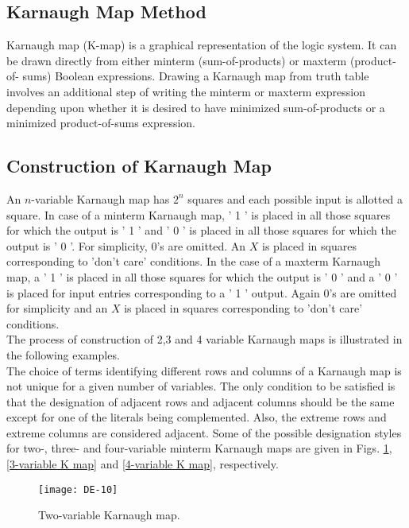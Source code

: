\subsection{Karnaugh Map Method}
Karnaugh map (K-map) is a graphical representation of
the logic system. It can be drawn directly from either
minterm (sum-of-products) or maxterm (product-of-
sums) Boolean expressions. Drawing a Karnaugh map
from truth table involves an additional step of writing
the minterm or maxterm expression depending upon
whether it is desired to have minimized sum-of-products
or a minimized product-of-sums expression.
\subsection{Construction of Karnaugh Map}
An $n$-variable Karnaugh map has $2^{n}$ squares and each possible input is allotted a square. In case of a minterm Karnaugh map, ' 1 ' is placed in all those squares for which the output is ' 1 ' and ' 0 ' is placed in all those squares for which the output is ' 0 '. For simplicity, 0's are omitted. An $X$ is placed in squares corresponding to 'don't care' conditions. In the case of a maxterm Karnaugh map, a ' 1 ' is placed in all those squares for which the output is ' 0 ' and a ' 0 ' is placed for input entries corresponding to a ' 1 ' output. Again 0's are omitted for simplicity and an $X$ is placed in squares corresponding to 'don't care' conditions.\\
The process of construction of 2,3 and 4 variable Karnaugh maps is illustrated in the following examples.\\
The choice of terms identifying different rows and columns of a Karnaugh map is not unique for a given number of variables. The only condition to be satisfied is that the designation of adjacent rows and adjacent columns should be the same except for one of the literals being complemented. Also, the extreme rows and extreme columns are considered adjacent. Some of the possible designation styles for two-, three- and four-variable minterm Karnaugh maps are given in Figs. \ref{2-variable K map}, \ref{3-variable K map} and \ref{4-variable K map}, respectively.\\
\begin{minipage}{0.45\textwidth}
	\begin{figure}[H]
		\centering
		\texttt{[image: DE-10]}
		\caption{Two-variable Karnaugh map.}
		\label{2-variable K map}
	\end{figure}
\end{minipage}
